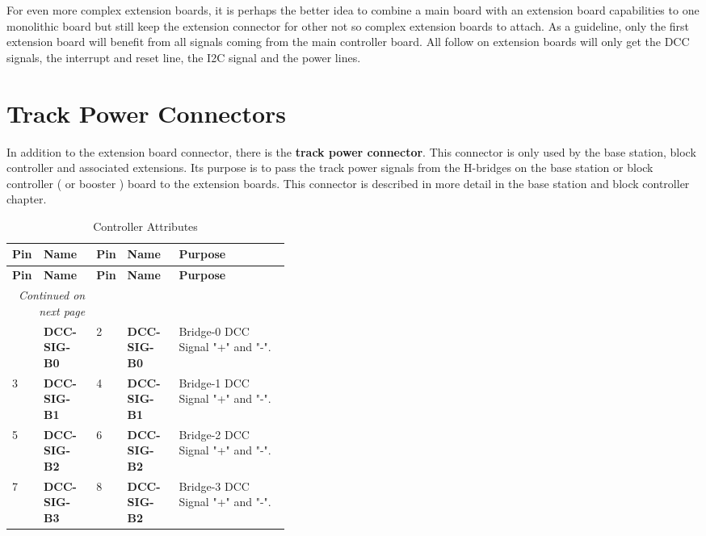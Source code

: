For even more complex extension boards, it is perhaps the better idea to combine a main board with an extension board capabilities to one monolithic board but still keep the extension connector for other not so complex extension boards to attach. As a guideline, only the first extension board will benefit from all signals coming from the main controller board. All follow on extension boards will only get the DCC signals, the interrupt and reset line, the I2C signal and the power lines.

\section{Track Power Connectors}

In addition to the extension board connector, there is the \textbf{track power connector}. This connector is only used by the base station, block controller and associated extensions. Its purpose is to pass the track power signals from the H-bridges on the base station or block controller ( or booster ) board to the extension boards. This connector is described in more detail in the base station and block controller chapter.

\begin{longtable}{@{}|l|l|l|l|p{0.4\linewidth}|@{}}
    \caption{Controller Attributes} \\
    \toprule
    \textbf{Pin} & \textbf{Name} & \textbf{Pin} & \textbf{Name}& \textbf{Purpose}\\
    \midrule
    \endfirsthead
    \toprule
    \textbf{Pin} & \textbf{Name} & \textbf{Pin} & \textbf{Name}& \textbf{Purpose}\\
    \midrule
    \endhead
    \midrule
    \multicolumn{2}{r}{\textit{Continued on next page}} \\
    \midrule
    \endfoot
    \bottomrule
    \endlastfoot
    1 & \textbf{DCC-SIG-B0} & 2 & \textbf{DCC-SIG-B0} & Bridge-0 DCC Signal "+" and "-". \\
    \midrule
    3 & \textbf{DCC-SIG-B1} & 4 & \textbf{DCC-SIG-B1} & Bridge-1 DCC Signal "+" and "-". \\
    \midrule
    5 & \textbf{DCC-SIG-B2} & 6 & \textbf{DCC-SIG-B2} & Bridge-2 DCC Signal "+" and "-". \\
    \midrule
    7 & \textbf{DCC-SIG-B3} & 8 & \textbf{DCC-SIG-B2} & Bridge-3 DCC Signal "+" and "-". \\
\end{longtable} 

\FloatBarrier


